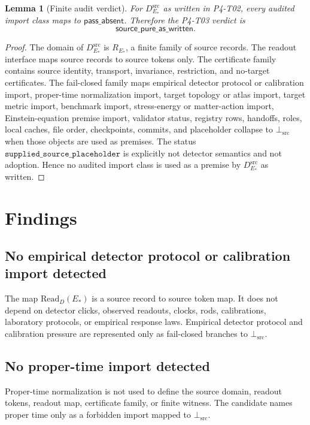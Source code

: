 \documentclass[11pt]{article}
\newcommand{\AuditVerdict}{\mathsf{source\_pure\_as\_written}}
\newcommand{\PassAbsent}{\mathsf{pass\_absent}}
\newcommand{\RStar}{R_{E_{\ast}}}
\newcommand{\DSrc}{D^{\mathrm{src}}_{E_{\ast}}}
\newcommand{\ReadD}{\mathrm{Read}_{D}(E_{\ast})}
\newcommand{\BottomSrc}{\bot_{\mathrm{src}}}
\newtheorem{lemma}{Lemma}
\begin{document}
\begin{lemma}[Finite audit verdict]
For \(\DSrc\) as written in P4-T02, every audited import class maps to
\(\PassAbsent\). Therefore the P4-T03 verdict is
\[
  \AuditVerdict .
\]
\end{lemma}

\begin{proof}
The domain of \(\DSrc\) is \(\RStar\), a finite family of source records. The
readout interface maps source records to source tokens only. The certificate
family contains source identity, transport, invariance, restriction, and
no-target certificates. The fail-closed family maps empirical detector
protocol or calibration import, proper-time normalization import, target
topology or atlas import, target metric import, benchmark import,
stress-energy or matter-action import, Einstein-equation premise import,
validator status, registry rows, handoffs, roles, local caches, file order,
checkpoints, commits, and placeholder collapse to \(\BottomSrc\) when those
objects are used as premises. The status
\(\texttt{supplied\_source\_placeholder}\) is explicitly not detector
semantics and not adoption. Hence no audited import class is used as a premise
by \(\DSrc\) as written.
\end{proof}

\section{Findings}

\subsection{No empirical detector protocol or calibration import detected}

The map \(\ReadD\) is a source record to source token map. It does not depend
on detector clicks, observed readouts, clocks, rods, calibrations, laboratory
protocols, or empirical response laws. Empirical detector protocol and
calibration pressure are represented only as fail-closed branches to
\(\BottomSrc\).

\subsection{No proper-time import detected}

Proper-time normalization is not used to define the source domain, readout
tokens, readout map, certificate family, or finite witness. The candidate
names proper time only as a forbidden import mapped to \(\BottomSrc\).
\end{document}
